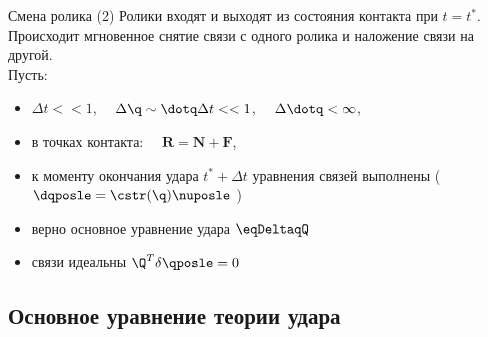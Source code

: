\begin{frame}{Смена ролика}
    \textcolor{Periwinkle}{(2) Ролики входят и выходят из состояния контакта при $t = t^*$.}\\
    Происходит мгновенное снятие связи с одного ролика и наложение связи на другой.\\
    Пусть:
    \begin{itemize}
        \item $\Delta t << 1$, $\quad \Delta \q \sim \dotq\Delta t << 1$, $\quad \Delta \dotq < \infty$,
        \item в точках контакта: $\quad \mathbf{R} = \mathbf{N} + \mathbf{F}$,
        \item к моменту окончания удара $t^*+\Delta t$ уравнения связей выполнены (\enspace $\dqposle = \cstr(\q)\nuposle \ $)
        \item верно основное уравнение удара \enspace $\eqDeltaqQ$
        \item связи идеальны \enspace $\Q^T\delta\qposle = 0$
    \end{itemize}
\end{frame}

\subsection{Основное уравнение теории удара}


